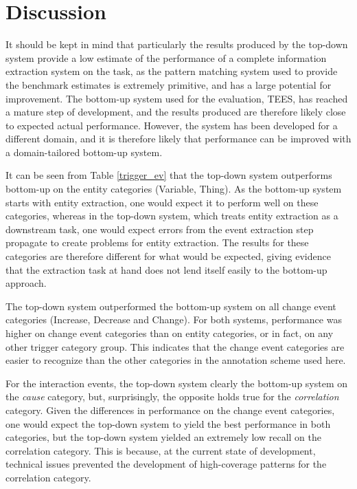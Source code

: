 \section{Discussion}

It should be kept in mind that particularly the results produced by the top-down system provide a low estimate of the performance of a complete information extraction system on the task, as the pattern matching system used to provide the benchmark estimates is extremely primitive, and has a large potential for improvement. The bottom-up system used for the evaluation, TEES, has reached a mature step of development, and the results produced are therefore likely close to expected actual performance. However, the system has been developed for a different domain, and it is therefore likely that performance can be improved with a domain-tailored bottom-up system.


It can be seen from Table \ref{trigger_ev} that the top-down system outperforms bottom-up on the entity categories (Variable, Thing). As the bottom-up system starts with entity extraction, one would expect it to perform well on these categories, whereas in the top-down system, which treats entity extraction as a downstream task, one would expect errors from the event extraction step propagate to create problems for entity extraction. The results for these categories are therefore different for what would be expected, giving evidence that the extraction task at hand does not lend itself easily to the bottom-up approach. 

The top-down system outperformed the bottom-up system on all change event categories (Increase, Decrease and Change). For both systems, performance was higher on change event categories than on entity categories, or in fact, on any other trigger category group. This indicates that the change event categories are easier to recognize than the other categories in the annotation scheme used here.

For the interaction events, the top-down system clearly the bottom-up system on the \emph{cause} category, but, surprisingly, the opposite holds true for the \emph{correlation} category. Given the differences in performance on the change event categories, one would expect the top-down system to yield the best performance in both categories, but the top-down system yielded an extremely low recall on the correlation category. This is because, at the current state of development, technical issues prevented the development of high-coverage patterns for the correlation category. 

